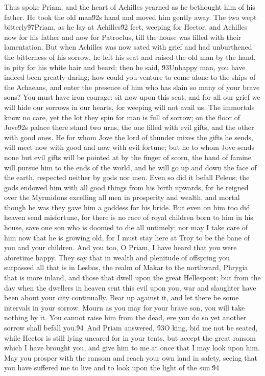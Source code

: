 {Thus spoke Priam, and the heart of Achilles yearned as he bethought him of his father. He took the old man\'92s hand and moved him gently away. The two wept bitterly\'97Priam, as he lay at Achilles\'92 feet, weeping for Hector, and Achilles now for his father and now for Patroclus, till the house was filled with their lamentation. But when Achilles was now sated with grief and had unburthened the bitterness of his sorrow, he left his seat and raised the old man by the hand, in pity for his white hair and beard; then he said, \'93Unhappy man, you have indeed been greatly daring; how could you venture to come alone to the ships of the Achaeans, and enter the presence of him who has slain so many of your brave sons? You must have iron courage: sit now upon this seat, and for all our grief we will hide our sorrows in our hearts, for weeping will not avail us. The immortals know no care, yet the lot they spin for man is full of sorrow; on the floor of Jove\'92s palace there stand two urns, the one filled with evil gifts, and the other with good ones. He for whom Jove the lord of thunder mixes the gifts he sends, will meet now with good and now with evil fortune; but he to whom Jove sends none but evil gifts will be pointed at by the finger of scorn, the hand of famine will pursue him to the ends of the world, and he will go up and down the face of the earth, respected neither by gods nor men. Even so did it befall Peleus; the gods endowed him with all good things from his birth upwards, for he reigned over the Myrmidons excelling all men in prosperity and wealth, and mortal though he was they gave him a goddess for his bride. But even on him too did heaven send misfortune, for there is no race of royal children born to him in his house, save one son who is doomed to die all untimely; nor may I take care of him now that he is growing old, for I must stay here at Troy to be the bane of you and your children. And you too, O Priam, I have heard that you were aforetime happy. They say that in wealth and plenitude of offspring you surpassed all that is in Lesbos, the realm of Makar to the northward, Phrygia that is more inland, and those that dwell upon the great Hellespont; but from the day when the dwellers in heaven sent this evil upon you, war and slaughter have been about your city continually. Bear up against it, and let there be some intervals in your sorrow. Mourn as you may for your brave son, you will take nothing by it. You cannot raise him from the dead, ere you do so yet another sorrow shall befall you.\'94\
And Priam answered, \'93O king, bid me not be seated, while Hector is still lying uncared for in your tents, but accept the great ransom which I have brought you, and give him to me at once that I may look upon him. May you prosper with the ransom and reach your own land in safety, seeing that you have suffered me to live and to look upon the light of the sun.\'94\
}
